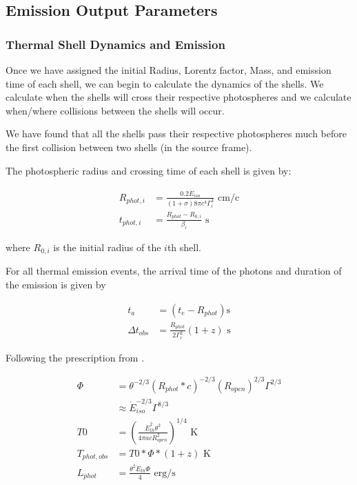 \documentclass[linenumbers,twocolumn]{aastex631}
\begin{document}
\subsection{Emission Output Parameters}
\subsubsection{Thermal Shell Dynamics and Emission}

Once we have assigned the initial Radius, Lorentz factor, Mass, and emission time of each shell, we can begin to calculate the dynamics of the shells. We calculate when the shells will cross their respective photospheres and we calculate when/where collisions between the shells will occur. 

We have found that all the shells pass their respective photospheres much before the first collision between two shells (in the source frame).

The photospheric radius and crossing time of each shell is given by:

\begin{align}
	R_{phot,i} &= \frac{0.2 \dot{E}_{iso}}{(1+\sigma)8\pi c^4 \Gamma_i^3} \text{ cm/c}\\
	t_{phot,i} &= \frac{R_{phot} - R_{0,i}}{\beta_i}\text{ s}
\end{align}

where $R_{0,i}$ is the initial radius of the $i$th shell.

For all thermal emission events, the arrival time of the photons and duration of the emission is given by

\begin{align}
	t_a &= (t_e - R_{phot}) \text{s}\\
	\Delta t_{obs} &= \frac{R_{phot}}{2\Gamma_r^2} (1+z) \text{ s}
\end{align}

Following the prescription from \citet{2013A&A...551A.124H}.

\begin{align}
	\Phi &= \theta^{-2/3} (R_{phot}*c)^{-2/3} (R_{open})^{2/3} \Gamma^{2/3}\\
	&\approx \dot{E}_{iso}^{-2/3} \Gamma^{8/3} \\
	T0 &= \left(\frac{\dot{E}_{th}^2 \theta^2}{4\pi a c R_{open}^2} \right)^{1/4} \text{ K} \\ 
	T_{phot,obs} &= T0*\Phi*(1+z) \text{ K} \\
	L_{phot} &= \frac{\theta^2 \dot{E}_{th} \Phi }{4} \text{ erg/s}
\end{align}
\end{document}
